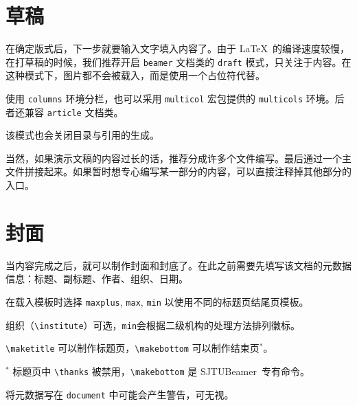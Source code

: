 \documentclass[
    UTF8,
    heading=true,
    12pt,
    a4paper
]{ctexrep}
\def\themename{\textsf{SJTUBeamer}}
\begin{document}

\chapter{草稿}

在确定版式后，下一步就要输入文字填入内容了。由于 \LaTeX\ 的编译速度较慢，在打草稿的时候，我们推荐开启 \texttt{beamer} 文档类的 \texttt{draft} 模式，只关注于内容。在这种模式下，图片都不会被载入，而是使用一个占位符代替。


\begin{commentlist}
  \item 使用 \texttt{columns} 环境分栏，也可以采用 \texttt{multicol} 宏包提供的 \texttt{multicols} 环境。后者还兼容 \texttt{article} 文档类。
  \item 该模式也会关闭目录与引用的生成。
\end{commentlist}

\clearpage

当然，如果演示文稿的内容过长的话，推荐分成许多个文件编写。最后通过一个主文件拼接起来。如果暂时想专心编写某一部分的内容，可以直接注释掉其他部分的入口。


\chapter{封面}

当内容完成之后，就可以制作封面和封底了。在此之前需要先填写该文档的元数据信息：标题、副标题、作者、组织、日期。


\begin{commentlist}
  \item 在载入模板时选择 \texttt{maxplus}, \texttt{max}, \texttt{min} 以使用不同的标题页结尾页模板。
  \item 组织（\texttt{\textbackslash{}institute}）可选，\texttt{min}会根据二级机构的处理方法排列徽标。
  \item \texttt{\textbackslash{}maketitle} 可以制作标题页，\texttt{\textbackslash{}makebottom} 可以制作结束页$^*$。
  \item$^*$ 标题页中 \texttt{\textbackslash{}thanks} 被禁用，\texttt{\textbackslash{}makebottom} 是 \themename\ 专有命令。
  \item[\faExclamationTriangle] 将元数据写在 \texttt{document} 中可能会产生警告，可无视。
\end{commentlist}
\end{document}
